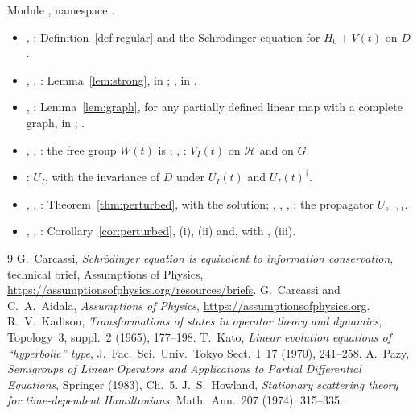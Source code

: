 \documentclass[11pt]{article}
\theoremstyle{definition}
\theoremstyle{remark}
\begin{document}
Module , namespace
.

\begin{itemize}
  \item {}, : Definition~\ref{def:regular} and
    the Schr\"odinger equation for $H_0 + V(t)$ on $D$.
  \item {},
    ,
    : Lemma~\ref{lem:strong}, in
    ;
    , in
    .
  \item {}, :
    Lemma~\ref{lem:graph}, for any partially defined linear map with a complete graph, in
    ; .
  \item {}, , : the free group $W(t)$ is
    ; , :
    $V_I(t)$ on $\mathcal H$ and on $G$.
  \item {}: $U_I$, with the invariance of $D$ under $U_I(t)$ and
    $U_I(t)^\dagger$.
  \item {}, , :
    Theorem~\ref{thm:perturbed}, with  the solution;
    , , , :
    the propagator $U_{s\to t}$.
  \item {}, ,
    : Corollary~\ref{cor:perturbed}, (i), (ii) and, with
    , (iii).
\end{itemize}

\begin{thebibliography}{9}
 G.~Carcassi, \emph{Schr\"odinger equation is equivalent to information
  conservation}, technical brief, Assumptions of Physics,
  \url{https://assumptionsofphysics.org/resources/briefs}.
 G.~Carcassi and C.~A.~Aidala, \emph{Assumptions of Physics},
  \url{https://assumptionsofphysics.org}.
 R.~V.~Kadison, \emph{Transformations of states in operator theory and
  dynamics}, Topology~3, suppl.~2 (1965), 177--198.
 T.~Kato, \emph{Linear evolution equations of ``hyperbolic'' type},
  J.~Fac.~Sci.~Univ.~Tokyo Sect.~I~17 (1970), 241--258.
 A.~Pazy, \emph{Semigroups of Linear Operators and Applications to Partial
  Differential Equations}, Springer (1983), Ch.~5.
 J.~S.~Howland, \emph{Stationary scattering theory for time-dependent
  Hamiltonians}, Math.~Ann.~207 (1974), 315--335.
\end{thebibliography}
\end{document}
